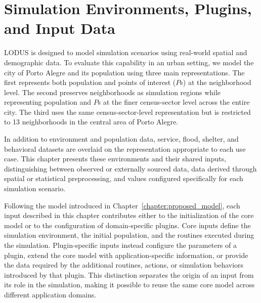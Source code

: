 \chapter{Simulation Environments, Plugins, and Input Data}
\label{sec:simulation_environments_and_data}



LODUS is designed to model simulation scenarios using real-world spatial and demographic data. 
To evaluate this capability in an urban setting, we model the city of Porto Alegre and its population using three main representations. 
The first represents both population and points of interest ($P$s) at the neighborhood level. The second preserves neighborhoods as simulation regions while representing population and $P$s at the finer census-sector level across the entire city. The third uses the same census-sector-level representation but is restricted to 13 neighborhoods in the central area of Porto Alegre. 

In addition to environment and population data, service, flood, shelter, and behavioral datasets are overlaid on the representation appropriate to each use case. This chapter presents these environments and their shared inputs, distinguishing between observed or externally sourced data, data derived through spatial or statistical preprocessing, and values configured specifically for each simulation scenario.

Following the model introduced in Chapter~\ref{chapter:proposed_model}, each input described in this chapter contributes either to the initialization of the core model or to the configuration of domain-specific plugins.
Core inputs define the simulation environment, the initial population, and the routines executed during the simulation. 
Plugin-specific inputs instead configure the parameters of a plugin, extend the core model with application-specific information, or provide the data required by the additional routines, actions, or simulation behaviors introduced by that plugin. 
This distinction separates the origin of an input from its role in the simulation, making it possible to reuse the same core model across different application domains.




